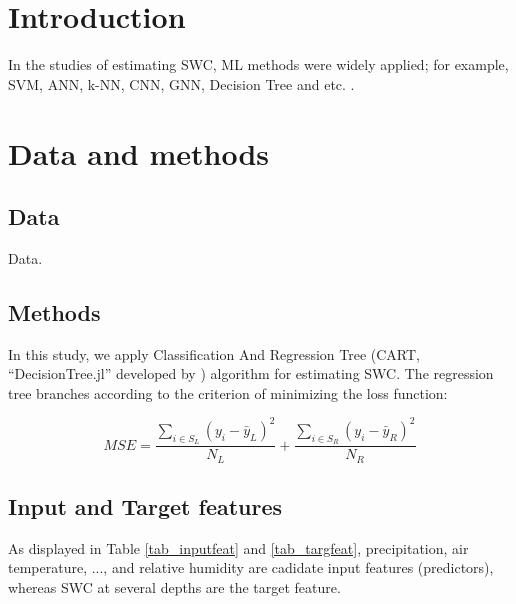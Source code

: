 \documentclass[twocolumn,3p,authoryear]{elsarticle}
\begin{document}

\section{Introduction}
\label{intro}
In the studies of estimating SWC, ML methods were widely applied; for example, SVM, ANN, k-NN, CNN, GNN, Decision Tree and etc. \citep{bordoniSoilWaterContent2018,leijHierarchicalPredictionSoil2022a,nemesSoftwareEstimate332008,maroufpoorSoilMoistureSimulation2019a,sobayoIntegrationConvolutionalNeural2018,vyasSemisupervisedSoilMoisture2020}.
%
%
\newpage






\section{Data and methods}
\subsection{Data}

Data.
\newpage








\subsection{Methods}
In this study, we apply Classification And Regression Tree (CART, ``DecisionTree.jl''  developed by \citet{benDecisionTreeJl}) algorithm for estimating SWC.
The regression tree branches according to the criterion of minimizing the loss function:

\begin{equation}
    MSE = \frac{\sum_{i\in S_L}(y_i - \bar{y}_L)^2}{N_L} + \frac{\sum_{i\in S_R}(y_i - \bar{y}_R)^2}{N_R} \label{eq_measureMSE}
\end{equation}


\newpage






\subsection{Input and Target features}
As displayed in Table \ref{tab_inputfeat} and \ref{tab_targfeat}, precipitation, air temperature, ..., and relative humidity are cadidate input features (predictors), whereas SWC at several depths are the target feature.
\end{document}
